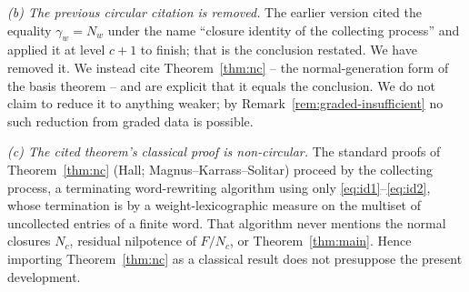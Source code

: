\documentclass{amsart}
\theoremstyle{definition}
\theoremstyle{remark}
\begin{document}
\emph{(b) The previous circular citation is removed.} The earlier version cited the
equality $\gamma_w=N_w$ under the name ``closure identity of the collecting
process'' and applied it at level $c+1$ to finish; that is the conclusion restated.
We have removed it. We instead cite Theorem~\ref{thm:nc} -- the normal-generation
form of the basis theorem -- and are explicit that it equals the conclusion. We do
not claim to reduce it to anything weaker; by Remark~\ref{rem:graded-insufficient}
no such reduction from graded data is possible.

\emph{(c) The cited theorem's classical proof is non-circular.} The standard proofs
of Theorem~\ref{thm:nc} (Hall; Magnus--Karrass--Solitar) proceed by the collecting
process, a terminating word-rewriting algorithm using only
\eqref{eq:id1}--\eqref{eq:id2}, whose termination is by a weight-lexicographic
measure on the multiset of uncollected entries of a finite word. That algorithm
never mentions the normal closures $N_c$, residual nilpotence of $F/N_c$, or
Theorem~\ref{thm:main}. Hence importing Theorem~\ref{thm:nc} as a classical result
does not presuppose the present development.
\end{document}
